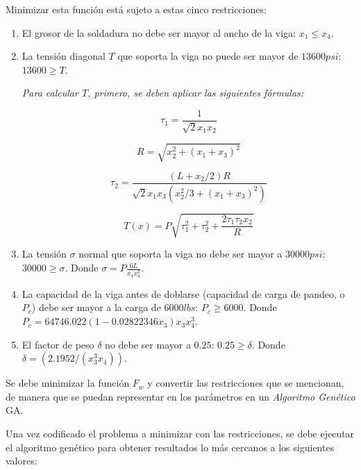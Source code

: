 \documentclass[a4paper, 12pt]{article}
\begin{document}
Minimizar esta función está sujeto a estas cinco restricciones:

\begin{enumerate}
    \item El grosor de la soldadura no debe ser mayor al ancho de la viga: $x_1\leq x_4$.
    \item La tensión diagonal $T$ que soporta la viga no puede ser mayor de $13600psi$: $13600\geq T$.

          \emph{Para calcular $T$, primero, se deben aplicar las siguientes fórmulas:}

          \begin{equation}
              \tau_1=\frac{1}{\sqrt{2}x_1x_2}
          \end{equation}

          \begin{equation}
              R=\sqrt{x_2^2+(x_1+x_3)^2}
          \end{equation}

          \begin{equation}
              \tau_2=\frac{(L + x_2/2)R}{\sqrt{2}x_1x_3(x_2^2/3+(x_1+x_3)^2)}
          \end{equation}

          \begin{equation}
              T(x)=P\sqrt{\tau_1^2+\tau_2^2+\frac{2\tau_1\tau_2x_2}{R}}
          \end{equation}

    \item La tensión $\sigma$ normal que soporta la viga no debe ser mayor a $30000psi$: $30000\geq\sigma$. Donde $\sigma=P\frac{6L}{x_4x_3^2}$.

    \item La capacidad de la viga antes de doblarse (capacidad de carga de pandeo, o $P_c$) debe ser mayor a la carga de $6000lbs$: $P_c\geq 6000$. Donde $P_c=64746.022(1-0.02822346x_3)x_3x_4^3$.

    \item El factor de peso $\delta$ no debe ser mayor a $0.25$: $0.25\geq \delta$. Donde $\delta=(2.1952/(x_3^3x_4))$.
\end{enumerate}

Se debe minimizar la función $F_w$ y convertir las restricciones que se mencionan, de manera que se puedan representar en los parámetros en un \emph{Algoritmo Genético} GA.

Una vez codificado el problema a minimizar con las restricciones, se debe ejecutar el algoritmo genético para obtener resultados lo más cercanos a los siguientes valores:
\end{document}
